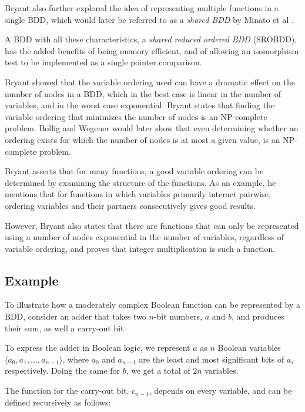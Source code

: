 \documentclass[a4paper,11pt]{kth-mag}
\begin{document}
Bryant also further explored the idea of representing multiple functions in a single BDD, which would later be referred to as a \emph{shared BDD} by Minato et al \cite{minato90}.

A BDD with all these characteristics, a \emph{shared reduced ordered BDD} (SROBDD), has the added benefits of being memory efficient, and of allowing an isomorphism test to be implemented as a single pointer comparison.

Bryant showed that the variable ordering used can have a dramatic effect on the number of nodes in a BDD, which in the best case is linear in the number of variables, and in the worst case exponential.
Bryant states that finding the variable ordering that minimizes the number of nodes is an NP-complete problem.
Bollig and Wegener \cite{bollig96} would later show that even determining whether an ordering exists for which the number of nodes is at most a given value, is an NP-complete problem.

Bryant asserts that for many functions, a good variable ordering can be determined by examining the structure of the functions.
As an example, he mentions that for functions in which variables primarily interact pairwise, ordering variables and their partners consecutively gives good results.

However, Bryant also states that there are functions that can only be represented using a number of nodes exponential in the number of variables, regardless of variable ordering, and proves that integer multiplication is such a function.


\subsection{Example}

To illustrate how a moderately complex Boolean function can be represented by a BDD, consider an adder that takes two $n$-bit numbers, $a$ and $b$, and produces their sum, as well a carry-out bit.

To express the adder in Boolean logic, we represent $a$ as $n$ Boolean variables $\langle a_0, a_1, ..., a_{n-1} \rangle$, where $a_0$ and $a_{n-1}$ are the least and most significant bits of $a$, respectively.
Doing the same for $b$, we get a total of $2n$ variables.

The function for the carry-out bit, $c_{n-1}$, depends on every variable, and can be defined recursively as follows:
\end{document}
